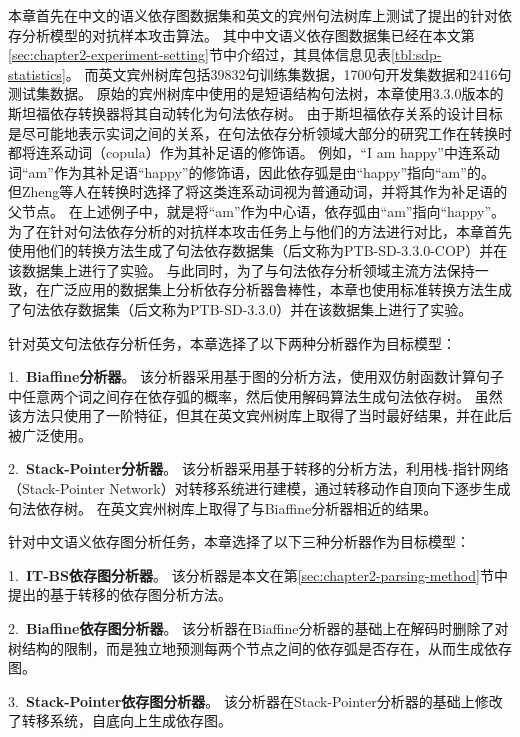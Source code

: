 本章首先在中文的语义依存图数据集和英文的宾州句法树库\cite{marcus-etal-1993-building}上测试了提出的针对依存分析模型的对抗样本攻击算法。
其中中文语义依存图数据集已经在本文第\ref{sec:chapter2-experiment-setting}节中介绍过，其具体信息见表\ref{tbl:sdp-statistics}。
而英文宾州树库包括39832句训练集数据，1700句开发集数据和2416句测试集数据。
原始的宾州树库中使用的是短语结构句法树，本章使用3.3.0版本的斯坦福依存转换器\cite{de-etal-2006-generating}将其自动转化为句法依存树。
由于斯坦福依存关系的设计目标是尽可能地表示实词之间的关系，在句法依存分析领域大部分的研究工作在转换时都将连系动词（copula）作为其补足语的修饰语。
例如，“I am happy”中连系动词“am”作为其补足语“happy”的修饰语，因此依存弧是由“happy”指向“am”的。
但Zheng等人\cite{zheng-etal-2020-evaluating}在转换时选择了将这类连系动词视为普通动词，并将其作为补足语的父节点。
在上述例子中，就是将“am”作为中心语，依存弧由“am”指向“happy”。
为了在针对句法依存分析的对抗样本攻击任务上与他们的方法进行对比，本章首先使用他们的转换方法生成了句法依存数据集（后文称为PTB-SD-3.3.0-COP）并在该数据集上进行了实验。
与此同时，为了与句法依存分析领域主流方法保持一致，在广泛应用的数据集上分析依存分析器鲁棒性，本章也使用标准转换方法生成了句法依存数据集（后文称为PTB-SD-3.3.0）并在该数据集上进行了实验。

针对英文句法依存分析任务，本章选择了以下两种分析器作为目标模型：

1.\ \textbf{Biaffine分析器}\cite{dozat-etal-2017-deep}。
该分析器采用基于图的分析方法，使用双仿射函数计算句子中任意两个词之间存在依存弧的概率，然后使用解码算法生成句法依存树。
虽然该方法只使用了一阶特征，但其在英文宾州树库上取得了当时最好结果，并在此后被广泛使用。

2.\ \textbf{Stack-Pointer分析器}\cite{ma-etal-2018-stack}。
该分析器采用基于转移的分析方法，利用栈-指针网络（Stack-Pointer Network）对转移系统进行建模，通过转移动作自顶向下逐步生成句法依存树。
在英文宾州树库上取得了与Biaffine分析器相近的结果。

针对中文语义依存图分析任务，本章选择了以下三种分析器作为目标模型：

1.\ \textbf{IT-BS依存图分析器}。
该分析器是本文在第\ref{sec:chapter2-parsing-method}节中提出的基于转移的依存图分析方法。

2.\ \textbf{Biaffine依存图分析器}\cite{dozat-manning-2018-simpler}。
该分析器在Biaffine分析器的基础上在解码时删除了对树结构的限制，而是独立地预测每两个节点之间的依存弧是否存在，从而生成依存图。

3.\ \textbf{Stack-Pointer依存图分析器}\cite{fernandez-etal-2020-transition}。
该分析器在Stack-Pointer分析器的基础上修改了转移系统，自底向上生成依存图。

